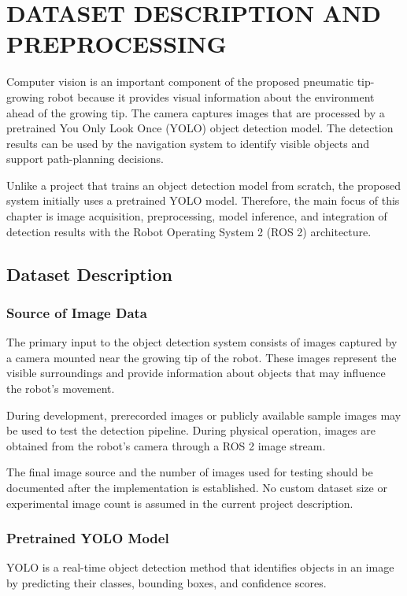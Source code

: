 \chapter{DATASET DESCRIPTION AND PREPROCESSING}

Computer vision is an important component of the proposed pneumatic tip-growing robot because it provides visual information about the environment ahead of the growing tip. The camera captures images that are processed by a pretrained You Only Look Once (YOLO) object detection model. The detection results can be used by the navigation system to identify visible objects and support path-planning decisions.

Unlike a project that trains an object detection model from scratch, the proposed system initially uses a pretrained YOLO model. Therefore, the main focus of this chapter is image acquisition, preprocessing, model inference, and integration of detection results with the Robot Operating System 2 (ROS 2) architecture.

\section{Dataset Description}

\subsection{Source of Image Data}

The primary input to the object detection system consists of images captured by a camera mounted near the growing tip of the robot. These images represent the visible surroundings and provide information about objects that may influence the robot's movement.

During development, prerecorded images or publicly available sample images may be used to test the detection pipeline. During physical operation, images are obtained from the robot's camera through a ROS 2 image stream.

The final image source and the number of images used for testing should be documented after the implementation is established. No custom dataset size or experimental image count is assumed in the current project description.

\subsection{Pretrained YOLO Model}

YOLO is a real-time object detection method that identifies objects in an image by predicting their classes, bounding boxes, and confidence scores.

